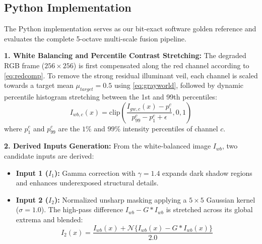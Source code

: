 \documentclass[10pt,twocolumn,letterpaper]{article}
\begin{document}
{\subsection{Python Implementation}
\label{subsec:python_impl}

The Python implementation serves as our bit-exact software golden reference and evaluates the complete 5-octave multi-scale fusion pipeline.

\textbf{1. White Balancing and Percentile Contrast Stretching:} 
The degraded RGB frame ($256\times256$) is first compensated along the red channel according to \cref{eq:redcomp}. To remove the strong residual illuminant veil, each channel is scaled towards a target mean $\mu_{target} = 0.5$ using \cref{eq:grayworld}, followed by dynamic percentile histogram stretching between the 1st and 99th percentiles:
\begin{equation}
  I_{wb,c}(x) = \text{clip}\!\left(\frac{I_{gw,c}(x) - p_{1}^c}{p_{99}^c - p_{1}^c + \epsilon}, 0, 1\right)
  \label{eq:stretch_cont}
\end{equation}
where $p_1^c$ and $p_{99}^c$ are the $1\%$ and $99\%$ intensity percentiles of channel $c$.

\textbf{2. Derived Inputs Generation:} 
From the white-balanced image $I_{wb}$, two candidate inputs are derived:
\begin{itemize}
    \item \textbf{Input 1 ($I_1$):} Gamma correction with $\gamma = 1.4$ expands dark shadow regions and enhances underexposed structural details.
    \item \textbf{Input 2 ($I_2$):} Normalized unsharp masking applying a $5\times 5$ Gaussian kernel ($\sigma = 1.0$). The high-pass difference $I_{wb} - G * I_{wb}$ is stretched across its global extrema and blended:
    \begin{equation}
      I_2(x) = \frac{I_{wb}(x) + \mathcal{N}\{I_{wb}(x) - G * I_{wb}(x)\}}{2.0}
    \end{equation}
\end{itemize}

}
\end{document}
